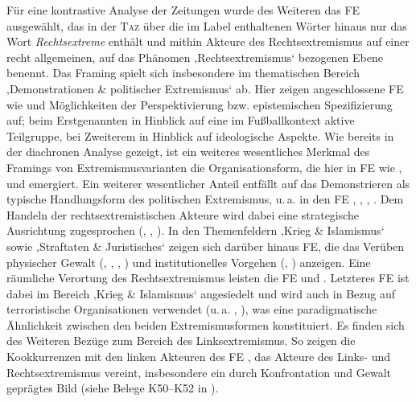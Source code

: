 Für eine kontrastive Analyse der Zeitungen wurde des Weiteren das FE  ausgewählt, das in der \textsc{Taz} über die im Label enthaltenen Wörter hinaus nur das Wort \emph{Rechtsextreme} enthält und mithin Akteure des Rechtsextremismus auf einer recht allgemeinen, auf das Phänomen ‚Rechtsextremismus` bezogenen Ebene benennt. Das Framing spielt sich insbesondere im thematischen Bereich ‚Demonstrationen \& politischer Extremismus` ab. Hier zeigen angeschlossene FE wie  und  Möglichkeiten der Perspektivierung bzw. epistemischen Spezifizierung auf; beim Erstgenannten in Hinblick auf eine im Fußballkontext aktive Teilgruppe, bei Zweiterem in Hinblick auf ideologische Aspekte. Wie bereits in der diachronen Analyse gezeigt, ist ein weiteres wesentliches Merkmal des Framings von Extremismusvarianten die Organisationsform, die hier in FE wie ,  und  emergiert. Ein weiterer wesentlicher Anteil entfällt auf das Demonstrieren als typische Handlungsform des politischen Extremismus, u.\,a. in den FE , , , . Dem Handeln der rechtsextremistischen Akteure wird dabei eine strategische Ausrichtung zugesprochen (, , ). In den Themenfeldern ‚Krieg \& Islamismus` sowie ‚Straftaten \& Juristisches` zeigen sich darüber hinaus FE, die das Verüben physischer Gewalt (, , , ) und institutionelles Vorgehen (, ) anzeigen. Eine räumliche Verortung des Rechtsextremismus leisten die FE  und . Letzteres FE ist dabei im Bereich ‚Krieg \& Islamismus` angesiedelt und wird auch in Bezug auf terroristische Organisationen verwendet (u.\,a. , ), was eine paradigmatische Ähnlichkeit zwischen den beiden Extremismusformen konstituiert. Es finden sich des Weiteren Bezüge zum Bereich des Linksextremismus. So zeigen die Kookkurrenzen mit den linken Akteuren des FE , das Akteure des Links- und Rechtsextremismus vereint, insbesondere ein durch Konfrontation und Gewalt geprägtes Bild (siehe Belege K50--K52 in ).

